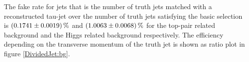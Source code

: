 %       
%   
%
 The fake rate for jets that is the number of truth jets matched with a reconstructed tau-jet over the number of truth jets satisfying the basic selection is $\SI{0.1741\pm 0.0019}{\percent}$ and $\SI{1.0063\pm 0.0068}{\percent}$ for the top-pair related background and the Higgs related background respectively.\newline
The efficiency depending on the transverse momentum of the truth jet is shown as ratio plot in figure \ref{DividedJet:bg}.
%
